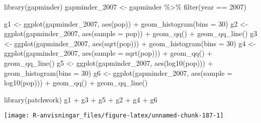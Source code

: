 \documentclass[
]{book}
\newenvironment{Shaded}{\begin{snugshade}}{\end{snugshade}}
\newcommand{\AttributeTok}[1]{\textcolor[rgb]{0.77,0.63,0.00}{#1}}
\newcommand{\DecValTok}[1]{\textcolor[rgb]{0.00,0.00,0.81}{#1}}
\newcommand{\FunctionTok}[1]{\textcolor[rgb]{0.00,0.00,0.00}{#1}}
\newcommand{\NormalTok}[1]{#1}
\newcommand{\OtherTok}[1]{\textcolor[rgb]{0.56,0.35,0.01}{#1}}
\newcommand{\SpecialCharTok}[1]{\textcolor[rgb]{0.00,0.00,0.00}{#1}}
\theoremstyle{definition}
\theoremstyle{definition}
\theoremstyle{definition}
\theoremstyle{definition}
\theoremstyle{remark}
\begin{document}
\begin{Shaded}
\begin{Highlighting}[]
\FunctionTok{library}\NormalTok{(gapminder)}
\NormalTok{gapminder\_2007 }\OtherTok{\textless{}{-}}\NormalTok{ gapminder }\SpecialCharTok{\%\textgreater{}\%} \FunctionTok{filter}\NormalTok{(year }\SpecialCharTok{==} \DecValTok{2007}\NormalTok{)}

\NormalTok{g1 }\OtherTok{\textless{}{-}} \FunctionTok{ggplot}\NormalTok{(gapminder\_2007, }\FunctionTok{aes}\NormalTok{(pop)) }\SpecialCharTok{+} \FunctionTok{geom\_histogram}\NormalTok{(}\AttributeTok{bins =} \DecValTok{30}\NormalTok{)}
\NormalTok{g2 }\OtherTok{\textless{}{-}} \FunctionTok{ggplot}\NormalTok{(gapminder\_2007, }\FunctionTok{aes}\NormalTok{(}\AttributeTok{sample =}\NormalTok{ pop)) }\SpecialCharTok{+} \FunctionTok{geom\_qq}\NormalTok{() }\SpecialCharTok{+} \FunctionTok{geom\_qq\_line}\NormalTok{()}
\NormalTok{g3 }\OtherTok{\textless{}{-}} \FunctionTok{ggplot}\NormalTok{(gapminder\_2007, }\FunctionTok{aes}\NormalTok{(}\FunctionTok{sqrt}\NormalTok{(pop))) }\SpecialCharTok{+} \FunctionTok{geom\_histogram}\NormalTok{(}\AttributeTok{bins =} \DecValTok{30}\NormalTok{)}
\NormalTok{g4 }\OtherTok{\textless{}{-}} \FunctionTok{ggplot}\NormalTok{(gapminder\_2007, }\FunctionTok{aes}\NormalTok{(}\AttributeTok{sample =} \FunctionTok{sqrt}\NormalTok{(pop))) }\SpecialCharTok{+} \FunctionTok{geom\_qq}\NormalTok{() }\SpecialCharTok{+} \FunctionTok{geom\_qq\_line}\NormalTok{()}
\NormalTok{g5 }\OtherTok{\textless{}{-}} \FunctionTok{ggplot}\NormalTok{(gapminder\_2007, }\FunctionTok{aes}\NormalTok{(}\FunctionTok{log10}\NormalTok{(pop))) }\SpecialCharTok{+} \FunctionTok{geom\_histogram}\NormalTok{(}\AttributeTok{bins =} \DecValTok{30}\NormalTok{)}
\NormalTok{g6 }\OtherTok{\textless{}{-}} \FunctionTok{ggplot}\NormalTok{(gapminder\_2007, }\FunctionTok{aes}\NormalTok{(}\AttributeTok{sample =} \FunctionTok{log10}\NormalTok{(pop))) }\SpecialCharTok{+} \FunctionTok{geom\_qq}\NormalTok{() }\SpecialCharTok{+} \FunctionTok{geom\_qq\_line}\NormalTok{()}

\FunctionTok{library}\NormalTok{(patchwork)}
\NormalTok{g1 }\SpecialCharTok{+}\NormalTok{ g3 }\SpecialCharTok{+}\NormalTok{ g5 }\SpecialCharTok{+}\NormalTok{ g2 }\SpecialCharTok{+}\NormalTok{ g4 }\SpecialCharTok{+}\NormalTok{ g6}
\end{Highlighting}
\end{Shaded}

\begin{center}\texttt{[image: R-anvisningar\_files/figure-latex/unnamed-chunk-187-1]} \end{center}
\end{document}
